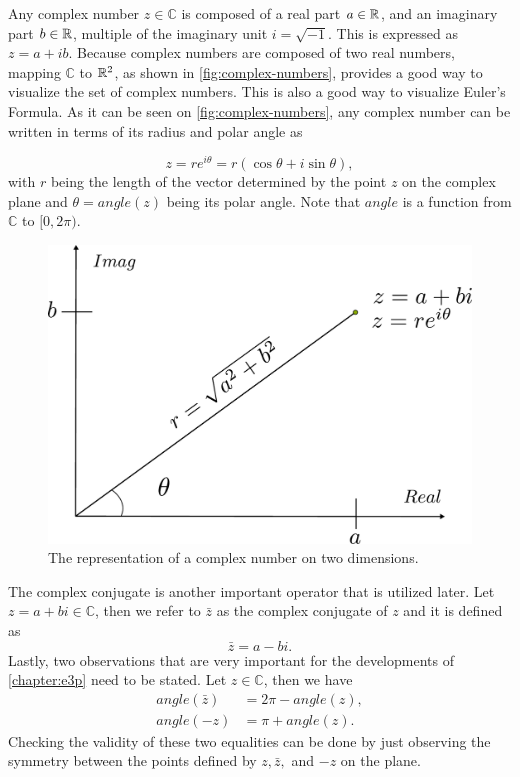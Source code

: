 Any complex number $z\in\mathbb{C}$ is composed of a real part $a\in\mathbb{R}$, and an imaginary part $b\in\mathbb{R}$, multiple of the imaginary unit $i = \sqrt{-1}$. This is expressed as $z=a+ib$. 
Because complex numbers are composed of two real numbers, mapping $\mathbb{C}$ to $\mathbb{R}^2$, as shown in  \autoref{fig:complex-numbers}, provides a good way to visualize the set of complex numbers. 
This is also a good way to visualize Euler's Formula. As it can be seen on \autoref{fig:complex-numbers}, any complex number can be written in terms of its radius and polar angle as

\begin{equation*}
z = re^{i\theta}=r(\cos{\theta} + i\sin{\theta}),
\end{equation*}
with $r$ being the length of the vector determined by the point $z$ on the complex plane and $\theta = angle(z)$ being its polar angle. Note that $angle$ is a function from $\mathbb{C}$ to $[0, 2\pi)$.
\begin{figure}[ht]
	\centering
	\def\svgwidth{\columnwidth}
	\includegraphics[scale=.37]{tex/figures/complex_numbers}
	\caption{The representation of a complex number on two dimensions.}
	\label{fig:complex-numbers}
\end{figure}

The complex conjugate is another important operator that is utilized later. Let $z = a + bi \in \mathbb{C}$, then we refer to $\bar{z}$ as the complex conjugate of $z$ and it is defined as
\begin{equation*}
\bar{z} = a - bi.
\end{equation*}
Lastly, two observations that are very important for the developments of \autoref{chapter:e3p} need to be stated. Let $z\in \mathbb{C}$, then we have 
\begin{align}
angle(\bar{z}) &= 2\pi-angle(z),\nonumber\\
angle(-z) &= \pi + angle(z).\label{eq:angle_op_sign}
\end{align}
Checking the validity of these two equalities can be done by just observing the symmetry between the points defined by $z, \bar{z},$ and $-z$ on the plane.


